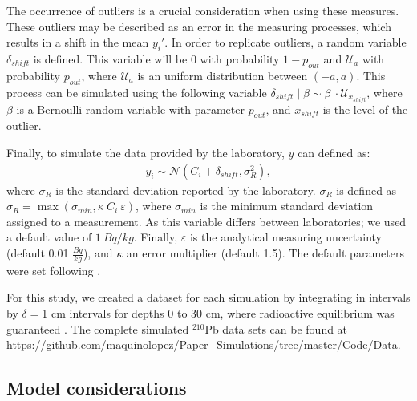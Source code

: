 \documentclass [10pt] {article}
\begin{document}
The occurrence of outliers is a crucial consideration when using these measures.
These outliers may be described as an error in the measuring processes, which results in a shift in the mean $y_i'$.
In order to replicate outliers, a random variable $\delta_{shift}$ is defined.
This variable will be $0$ with probability $1-p_{out}$ and $\mathcal{U}_a$ with probability $p_{out}$, where $\mathcal{U}_a$ is an uniform distribution between $(-a,a)$.
This process can be simulated using the following variable $\delta_{shift}\mid\beta \sim \beta\ \cdot \mathcal{U}_{x_{shift}}$, where $\beta$ is a Bernoulli random variable with parameter $p_{out}$, and $x_{shift}$ is the level of the outlier. 

Finally, to simulate the data provided by the laboratory, $y$ can defined as:   
\begin{align}
	y_i\sim\mathcal{N}\left(C_{i} + \delta_{shift}, \sigma^2_{R} \right), 
\end{align}
where $\sigma_R$ is the standard deviation reported by the laboratory. 
$\sigma_R$ is defined as $\sigma_R= \max \left(\sigma_{min}, \kappa~C_i ~\varepsilon \right)$, where $\sigma_{min}$ is the minimum standard deviation assigned to a measurement. As this variable differs between laboratories; we used a default value of $1~ Bq/kg$. %
Finally, $\varepsilon$ is the analytical measuring uncertainty (default 0.01 $\frac{Bq}{kg}$), and $\kappa$ an error multiplier (default 1.5).
The default parameters were set following \citet{Blaauw2018}.


For this study, we created a dataset for each simulation by integrating in intervals by $\delta =$1 cm intervals for depths 0 to 30 cm, where radioactive equilibrium was guaranteed \citep{Aquino2018}.
The complete simulated $^{210}$Pb data sets can be found at \url{https://github.com/maquinolopez/Paper\_Simulations/tree/master/Code/Data}.

\subsection{Model considerations}
\end{document}
